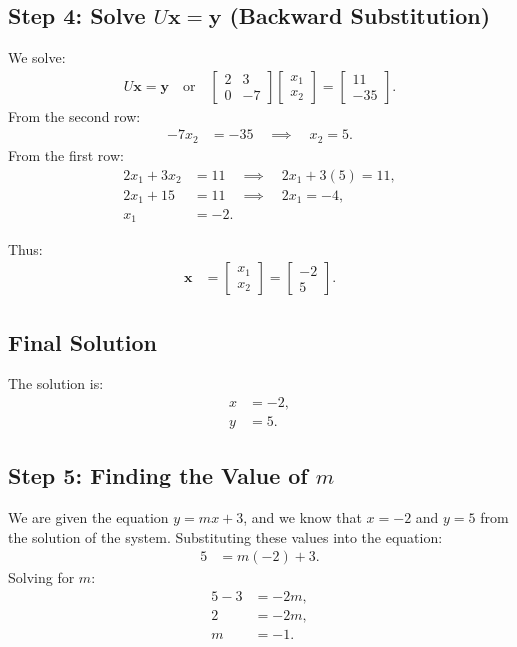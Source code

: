 \documentclass[journal]{IEEEtran}
\begin{document}
\subsection*{Step 4: Solve $U\mathbf{x} = \mathbf{y}$ (Backward Substitution)}
We solve:
\begin{align}
U\mathbf{x} = \mathbf{y} \quad \text{or} \quad \begin{bmatrix} 2 & 3 \\ 0 & -7 \end{bmatrix} \begin{bmatrix} x_1 \\ x_2 \end{bmatrix} = \begin{bmatrix} 11 \\ -35 \end{bmatrix}.
\end{align}
From the second row:
\begin{align}
-7x_2 &= -35 \quad \implies \quad x_2 = 5.
\end{align}
From the first row:
\begin{align}
2x_1 + 3x_2 &= 11 \quad \implies \quad 2x_1 + 3(5) = 11, \\
2x_1 + 15 &= 11 \quad \implies \quad 2x_1 = -4, \\
x_1 &= -2.
\end{align}

Thus:
\begin{align}
\mathbf{x} &= \begin{bmatrix} x_1 \\ x_2 \end{bmatrix} = \begin{bmatrix} -2 \\ 5 \end{bmatrix}.
\end{align}

\subsection*{Final Solution}
The solution is:
\begin{align}
x &= -2, \\
y &= 5.
\end{align}
\subsection*{Step 5: Finding the Value of \( m \)}

We are given the equation \( y = mx + 3 \), and we know that \( x = -2 \) and \( y = 5 \) from the solution of the system. Substituting these values into the equation:
\begin{align}
5 &= m(-2) + 3.
\end{align}
Solving for \( m \):
\begin{align}
5 - 3 &= -2m, \\
2 &= -2m, \\
m &= -1.
\end{align}
\end{document}
